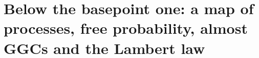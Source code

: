 \chapter{Below the basepoint one: a map of processes, free probability, almost GGCs and the Lambert law}\label{vol1:ch14}







